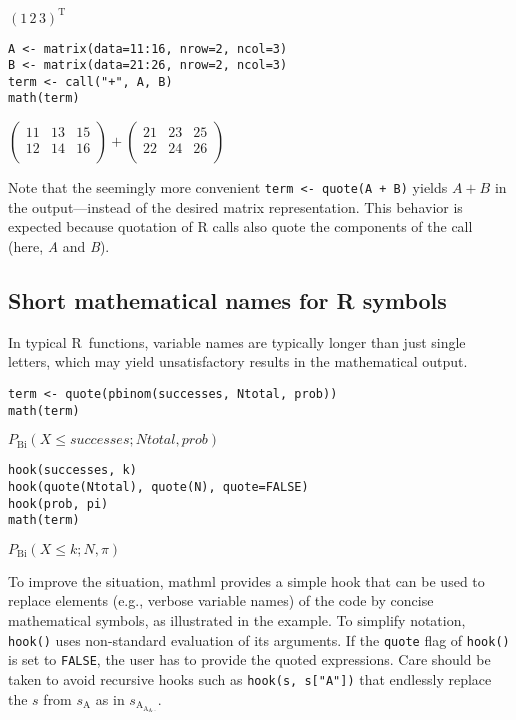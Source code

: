 \({\left({1}{{\,}{2}{{\,}{3}}}\right)}^{\mathrm{T}}\)

\begin{verbatim}
A <- matrix(data=11:16, nrow=2, ncol=3)
B <- matrix(data=21:26, nrow=2, ncol=3)
term <- call("+", A, B)
math(term)
\end{verbatim}

\({\left(\begin{array}{ccc}11 & 13 & 15\\ 12 & 14 & 16\\ \end{array}\right)}{+}{\left(\begin{array}{ccc}21 & 23 & 25\\ 22 & 24 & 26\\ \end{array}\right)}\)

Note that the seemingly more convenient \texttt{term~\textless{}-~quote(A~+~B)} yields
\(A + B\) in the output---instead of the desired matrix representation.
This behavior is expected because quotation of R calls also quote the
components of the call (here, \emph{A} and \emph{B}).

\hypertarget{short-mathematical-names-for-r-symbols}{%
\subsection{Short mathematical names for R symbols}\label{short-mathematical-names-for-r-symbols}}

In typical R~functions, variable names are typically longer than just
single letters, which may yield unsatisfactory results in the
mathematical output.

\begin{verbatim}
term <- quote(pbinom(successes, Ntotal, prob))
math(term)
\end{verbatim}

\({P}_{\mathrm{Bi}}{\left({{X}{\le}{successes}}{{;}{{Ntotal}{{,}{prob}}}}\right)}\)

\begin{verbatim}
hook(successes, k)
hook(quote(Ntotal), quote(N), quote=FALSE)
hook(prob, pi)
math(term)
\end{verbatim}

\({P}_{\mathrm{Bi}}{\left({{X}{\le}{k}}{{;}{{N}{{,}{\pi}}}}\right)}\)

To improve the situation, mathml provides a simple hook that can be used
to replace elements (e.g., verbose variable names) of the code by
concise mathematical symbols, as illustrated in the example. To simplify
notation, \texttt{hook()} uses non-standard evaluation of its arguments. If the
\texttt{quote} flag of \texttt{hook()} is set to \texttt{FALSE}, the user has to provide the
quoted expressions. Care should be taken to avoid recursive hooks such
as \texttt{hook(s,~s{[}"A"{]})} that endlessly replace the \(s\) from
\(s_{\mathrm{A}}\) as in \(s_{\mathrm{A}_{\mathrm{A}_{\mathrm{A}\cdots}}}\).

